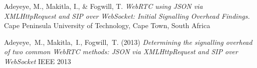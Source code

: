 \documentclass[english,12pt,a4paper,dvips]{article}
\begin{document}
\begin{thebibliography}{99}
 Adeyeye, M., Makitla, I., & Fogwill, T. \textit{WebRTC using JSON via XMLHttpRequest and SIP over WebSocket: Initial Signalling Overhead Findings.} Cape Peninsula University of Technology, Cape Town, South Africa



 Adeyeye,\ M., Makitla,\ I., Fogwill,\ T. (2013) \textit{Determining the signalling overhead of two common WebRTC methods: JSON via XMLHttpRequest and SIP over WebSocket} IEEE 2013


\end{thebibliography}
\end{document}
